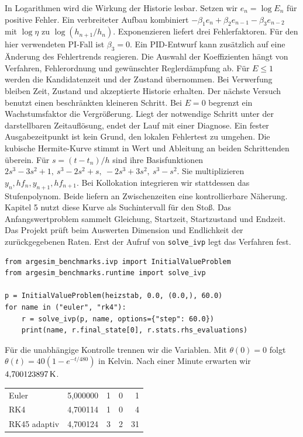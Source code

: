 In Logarithmen wird die Wirkung der Historie lesbar. Setzen wir \(e_n=\log E_n\) für positive Fehler. Ein verbreiteter Aufbau kombiniert \(-\beta_1 e_n+\beta_2e_{n-1}-\beta_3e_{n-2}\) mit \(\log\eta\) zu \(\log(h_{n+1}/h_n)\). Exponenzieren liefert drei Fehlerfaktoren. Für den hier verwendeten PI-Fall ist \(\beta_3=0\). Ein PID-Entwurf kann zusätzlich auf eine Änderung des Fehlertrends reagieren. Die Auswahl der Koeffizienten hängt von Verfahren, Fehlerordnung und gewünschter Reglerdämpfung ab.
\hypertarget{punkt2-3-3}{}
Für \(E\le1\) werden die Kandidatenzeit und der Zustand übernommen. Bei Verwerfung bleiben Zeit, Zustand und akzeptierte Historie erhalten. Der nächste Versuch benutzt einen beschränkten kleineren Schritt. Bei \(E=0\) begrenzt ein Wachstumsfaktor die Vergrößerung. Liegt der notwendige Schritt unter der darstellbaren Zeitauflösung, endet der Lauf mit einer Diagnose. Ein fester Ausgabezeitpunkt ist kein Grund, den lokalen Fehlertest zu umgehen.
\hypertarget{punkt2-3-4}{}
Die kubische Hermite-Kurve stimmt in Wert und Ableitung an beiden Schrittenden überein. Für \(s=(t-t_n)/h\) sind ihre Basisfunktionen \(2s^3-3s^2+1,\ s^3-2s^2+s,\ -2s^3+3s^2,\ s^3-s^2\). Sie multiplizieren \(y_n,h f_n,y_{n+1},h f_{n+1}\). Bei Kollokation integrieren wir stattdessen das Stufenpolynom. Beide liefern an Zwischenzeiten eine kontrollierbare Näherung. Kapitel 5 nutzt diese Kurve als Suchintervall für den Stoß.
Das Anfangswertproblem sammelt Gleichung, Startzeit, Startzustand und Endzeit. Das Projekt prüft beim Auswerten Dimension und Endlichkeit der zurückgegebenen Raten. Erst der Aufruf von \texttt{solve\_ivp} legt das Verfahren fest.
{\footnotesize\begin{verbatim}
from argesim_benchmarks.ivp import InitialValueProblem
from argesim_benchmarks.runtime import solve_ivp

p = InitialValueProblem(heizstab, 0.0, (0.0,), 60.0)
for name in ("euler", "rk4"):
    r = solve_ivp(p, name, options={"step": 60.0})
    print(name, r.final_state[0], r.stats.rhs_evaluations)
\end{verbatim}}
Für die unabhängige Kontrolle trennen wir die Variablen. Mit \(\theta(0)=0\) folgt \(\theta(t)=40(1-e^{-t/480})\) in Kelvin. Nach einer Minute erwarten wir \(4{,}700123897\,\mathrm{K}\).
{\tblstart\begin{tabularx}{\linewidth}{@{}Yrrrr@{}}\toprule
{}&&&&\\\midrule
Euler&5,000000&1&0&1\\
RK4&4,700114&1&0&4\\
RK45 adaptiv&4,700124&3&2&31\\\bottomrule
\end{tabularx}\par}
